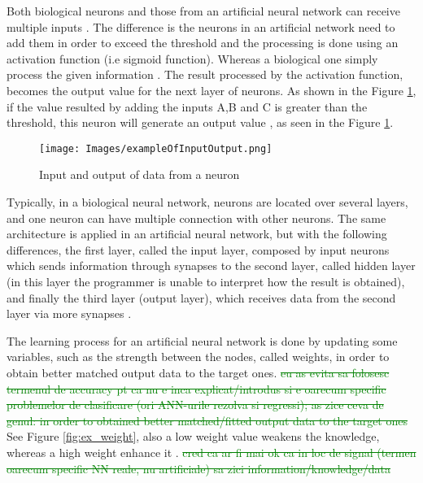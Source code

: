Both biological neurons and those from an artificial neural network can receive multiple inputs \cite{clinical}. The difference is the neurons in an artificial network need to add them in order to exceed the threshold and the processing is done using an activation function (i.e sigmoid function). Whereas a biological one simply process the given information \cite{NNandML, ANNbriefOverview}. The result processed by the activation function, becomes the output value for the next layer of neurons. As shown in the Figure \ref{fig:ex_input}, if the value resulted by adding the inputs A,B and C is greater than the threshold, this neuron will generate an output value  \cite{ANNBasic, MakeyourOwn}, as seen in the Figure \ref{fig:ex_input}.

\begin{figure}[h!]
    \centering
    \texttt{[image: Images/exampleOfInputOutput.png]}
    \caption{Input and output of data from a neuron \cite{ANNBasic}}
    \label{fig:ex_input}
\end{figure}

Typically, in a biological neural network, neurons are located over several layers, and one neuron can have multiple connection with other neurons. The same architecture is applied in an artificial neural network, but with the following differences, the first layer, called the input layer, composed by input neurons which sends information through synapses to the second layer, called hidden layer (in this layer the programmer is unable to interpret how the result is obtained), and finally the third layer (output layer), which receives data from the second layer via more synapses \cite{MakeyourOwn, RealTime, ANNbriefOverview, NNandML}. \par

The learning process for an artificial neural network is done by updating some variables, such as the strength between the nodes, called weights, in order to obtain better matched output data to the target ones. \textcolor{green}{\sout{eu as evita sa folosesc termenul de accuracy pt ca nu e inca explicat/introdus si e oarecum specific problemelor de clasificare (ori ANN-urile rezolva si regressi); as zice ceva de genul: in order to obtained better matched/fitted output data to the target ones}} See Figure \ref{fig:ex_weight}, also a low weight value weakens the knowledge, whereas a high weight enhance it \cite{MakeyourOwn, NNandML, ANNbriefOverview, ClassifNN}.
\textcolor{green}{\sout{cred ca ar fi mai ok ca in loc de signal (termen oarecum specific NN reale, nu artificiale) sa zici information/knowledge/data}}

